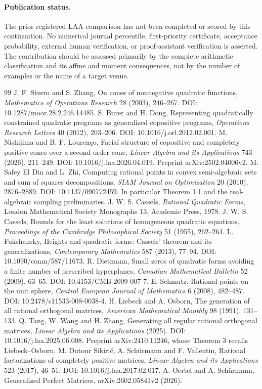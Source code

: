 \paragraph{Publication status.} The prior registered LAA comparison has not been completed or scored by this continuation. No numerical journal percentile, first-priority certificate, acceptance probability, external human verification, or proof-assistant verification is asserted. The contribution should be assessed primarily by the complete arithmetic classification and its affine and moment consequences, not by the number of examples or the name of a target venue.

\begin{thebibliography}{99}
 J. F. Sturm and S. Zhang, On cones of nonnegative quadratic functions, \emph{Mathematics of Operations Research} 28 (2003), 246--267. DOI: 10.1287/moor.28.2.246.14485.
 S. Burer and H. Dong, Representing quadratically constrained quadratic programs as generalized copositive programs, \emph{Operations Research Letters} 40 (2012), 203--206. DOI: 10.1016/j.orl.2012.02.001.
 M. Nishijima and B. F. Louren\c{c}o, Facial structure of copositive and completely positive cones over a second-order cone, \emph{Linear Algebra and its Applications} 743 (2026), 211--249. DOI: 10.1016/j.laa.2026.04.019. Preprint arXiv:2502.04006v2.
 M. Safey El Din and L. Zhi, Computing rational points in convex semi-algebraic sets and sum of squares decompositions, \emph{SIAM Journal on Optimization} 20 (2010), 2876--2889. DOI: 10.1137/090772459. In particular Theorem 1.1 and the real-algebraic sampling preliminaries.
 J. W. S. Cassels, \emph{Rational Quadratic Forms}, London Mathematical Society Monographs 13, Academic Press, 1978.
 J. W. S. Cassels, Bounds for the least solutions of homogeneous quadratic equations, \emph{Proceedings of the Cambridge Philosophical Society} 51 (1955), 262--264.
 L. Fukshansky, Heights and quadratic forms: Cassels' theorem and its generalizations, \emph{Contemporary Mathematics} 587 (2013), 77--94. DOI: 10.1090/conm/587/11673.
 R. Dietmann, Small zeros of quadratic forms avoiding a finite number of prescribed hyperplanes, \emph{Canadian Mathematical Bulletin} 52 (2009), 63--65. DOI: 10.4153/CMB-2009-007-7.
 E. Schmutz, Rational points on the unit sphere, \emph{Central European Journal of Mathematics} 6 (2008), 482--487. DOI: 10.2478/s11533-008-0038-4.
 H. Liebeck and A. Osborn, The generation of all rational orthogonal matrices, \emph{American Mathematical Monthly} 98 (1991), 131--133.
 Q. Tang, W. Wang and H. Zhang, Generating all regular rational orthogonal matrices, \emph{Linear Algebra and its Applications} (2025). DOI: 10.1016/j.laa.2025.06.008. Preprint arXiv:2410.11246, whose Theorem 3 recalls Liebeck--Osborn.
 M. Dutour Sikiri\'c, A. Sch\"urmann and F. Vallentin, Rational factorizations of completely positive matrices, \emph{Linear Algebra and its Applications} 523 (2017), 46--51. DOI: 10.1016/j.laa.2017.02.017.
 A. Oertel and A. Sch\"urmann, Generalized Perfect Matrices, arXiv:2602.05841v2 (2026).
\end{thebibliography}
